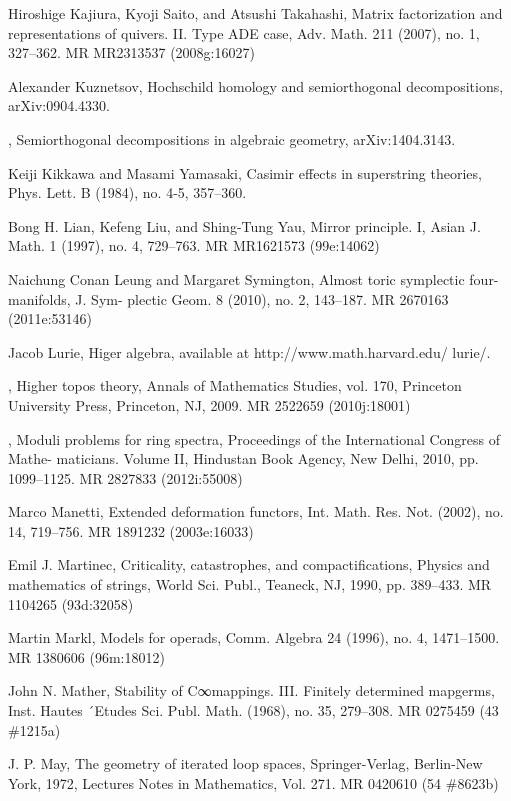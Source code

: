 {\begin{list}{}{%
  \setlength{\leftmargin}{3.4em}%
  \setlength{\itemindent}{-3.4em}%
  \setlength{\itemsep}{1.5pt}%
  \setlength{\parsep}{0pt}%
  \setlength{\listparindent}{0pt}%
}
\item[{[KST07]}] Hiroshige Kajiura, Kyoji Saito, and Atsushi Takahashi, Matrix factorization and representations of quivers. II. Type ADE case, Adv. Math. 211 (2007), no. 1, 327--362. MR MR2313537 (2008g:16027)
\item[{[Kuza]}] Alexander Kuznetsov, Hochschild homology and semiorthogonal decompositions, arXiv:0904.4330.
\item[{[Kuzb]}] , Semiorthogonal decompositions in algebraic geometry, arXiv:1404.3143.
\item[{[KY84]}] Keiji Kikkawa and Masami Yamasaki, Casimir effects in superstring theories, Phys. Lett. B (1984), no. 4-5, 357--360.
\item[{[LLY97]}] Bong H. Lian, Kefeng Liu, and Shing-Tung Yau, Mirror principle. I, Asian J. Math. 1 (1997), no. 4, 729--763. MR MR1621573 (99e:14062)
\item[{[LS10]}] Naichung Conan Leung and Margaret Symington, Almost toric symplectic four-manifolds, J. Sym- plectic Geom. 8 (2010), no. 2, 143--187. MR 2670163 (2011e:53146)
\item[{[Lur]}] Jacob Lurie, Higer algebra, available at http://www.math.harvard.edu/ lurie/.
\item[{[Lur09]}] , Higher topos theory, Annals of Mathematics Studies, vol. 170, Princeton University Press, Princeton, NJ, 2009. MR 2522659 (2010j:18001)
\item[{[Lur10]}] , Moduli problems for ring spectra, Proceedings of the International Congress of Mathe- maticians. Volume II, Hindustan Book Agency, New Delhi, 2010, pp. 1099--1125. MR 2827833 (2012i:55008)
\item[{[Man02]}] Marco Manetti, Extended deformation functors, Int. Math. Res. Not. (2002), no. 14, 719--756. MR 1891232 (2003e:16033)
\item[{[Mar90]}] Emil J. Martinec, Criticality, catastrophes, and compactifications, Physics and mathematics of strings, World Sci. Publ., Teaneck, NJ, 1990, pp. 389--433. MR 1104265 (93d:32058)
\item[{[Mar96]}] Martin Markl, Models for operads, Comm. Algebra 24 (1996), no. 4, 1471--1500. MR 1380606 (96m:18012)
\item[{[Mat68]}] John N. Mather, Stability of C∞mappings. III. Finitely determined mapgerms, Inst. Hautes ´Etudes Sci. Publ. Math. (1968), no. 35, 279--308. MR 0275459 (43 \#1215a)
\item[{[May72]}] J. P. May, The geometry of iterated loop spaces, Springer-Verlag, Berlin-New York, 1972, Lectures Notes in Mathematics, Vol. 271. MR 0420610 (54 \#8623b)

\end{list}}
